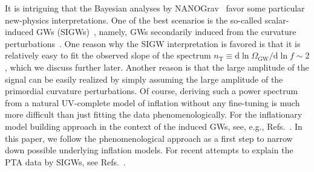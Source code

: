 \documentclass[superscriptaddress, aps, preprintnumbers,
amsmath, amssymb, sort&compress, nofootinbib, 10pt, paper, floatfix]{revtex4-2}
\begin{document}
It is intriguing that the Bayesian analyses by NANOGrav~\cite{NANOGrav:2023hvm} favor some particular new-physics interpretations.  One of the best scenarios is the so-called scalar-induced GWs (SIGWs)~\cite{NANOGrav:2023hvm, Figueroa:2023zhu}, namely, GWs secondarily induced from the curvature perturbations~\cite{10.1143/PTP.37.831, Matarrese:1993zf, Matarrese:1997ay, Ananda:2006af, Baumann:2007zm}. 
One reason why the SIGW interpretation is favored is that it is relatively easy to fit the observed slope of the spectrum $n_\text{T} \equiv \mathrm{d} \ln \Omega_\text{GW} / \mathrm{d}\ln f \sim 2$,  which we discuss further later. 
Another reason is that the large amplitude of the signal can be easily realized by simply assuming the large amplitude of the primordial curvature perturbations.
Of course, deriving such a power spectrum from a natural UV-complete model of inflation without any fine-tuning is much more difficult than just fitting the data phenomenologically. For the inflationary model building approach in the context of the induced GWs, see, e.g., Refs.~\cite{Inomata:2016rbd, Orlofsky:2016vbd, Di:2017ndc, Ando:2017veq,Drees:2019xpp, Fu:2022ypp}.  In this paper, we follow the phenomenological approach as a first step to narrow down possible underlying inflation models. For recent attempts to explain the PTA data by SIGWs, see Refs.~\cite{Vaskonen:2020lbd, DeLuca:2020agl, Kohri:2020qqd, Domenech:2020ers, Inomata:2020xad, Kawasaki:2021ycf, Dandoy:2023jot, Madge:2023cak, Franciolini:2023pbf,Cai:2023dls, Wang:2023ost, Liu:2023ymk,  Abe:2023yrw, Zhu:2023faa, Firouzjahi:2023lzg,  Bari:2023rcw, HosseiniMansoori:2023mqh, Balaji:2023ehk, Zhao:2023joc, Liu:2023pau, Yi:2023tdk, Frosina:2023nxu, Choudhury:2023wrm, Kawasaki:2023rfx,Yi:2023npi}.
\end{document}
